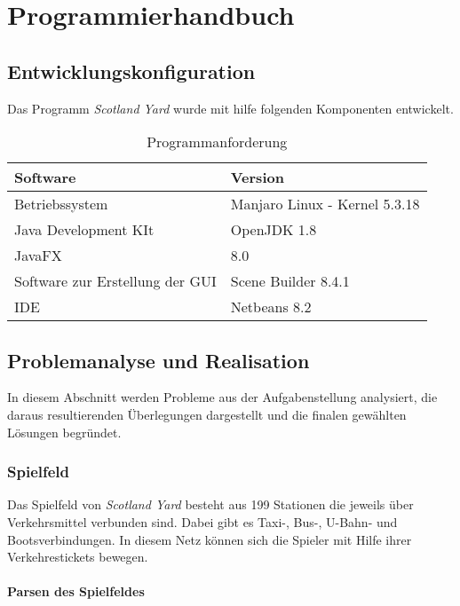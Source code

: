 \chapter{Programmierhandbuch}

    \section{Entwicklungskonfiguration}
        Das Programm \textit{Scotland Yard} wurde mit hilfe folgenden Komponenten entwickelt.
        \begin{table}[H]
            \caption{Programmanforderung}
            \begin{tabular}{p{6cm}  p{6cm}} 
                \hline
                \textbf{Software} & \textbf{Version}\\
                \hline
                Betriebssystem & Manjaro Linux - Kernel 5.3.18\\
                Java Development KIt & OpenJDK 1.8\\
                JavaFX & 8.0\\
                Software zur Erstellung der GUI &  Scene Builder 8.4.1\\
                IDE & Netbeans 8.2\\
                \hline
            \end{tabular}
        \end{table}

    \newpage
    \section{Problemanalyse und Realisation}
        In diesem Abschnitt werden Probleme aus der Aufgabenstellung analysiert, die daraus resultierenden
        Überlegungen dargestellt und die finalen gewählten Lösungen begründet.

        \subsection{Spielfeld}\label{gameboard}

            Das Spielfeld von \textit{Scotland Yard} besteht aus 199 Stationen die jeweils über Verkehrsmittel verbunden sind.
            Dabei gibt es Taxi-, Bus-, U-Bahn- und Bootsverbindungen.
            In diesem Netz können sich die Spieler mit Hilfe ihrer Verkehrestickets bewegen.
            
            \subsubsection{Parsen des Spielfeldes}

